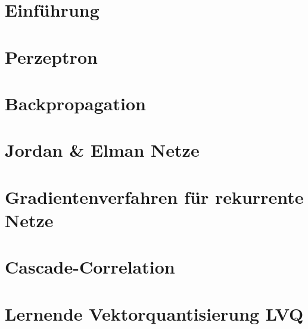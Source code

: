 \documentclass[fleqn,10pt]{SelfArx} %
\begin{document}


\section{Einführung} 


\section{Perzeptron}

\section{Backpropagation}

\section{Jordan \& Elman Netze}

\section{Gradientenverfahren für rekurrente Netze}

\section{Cascade-Correlation}

\section{Lernende Vektorquantisierung LVQ}
\end{document}
